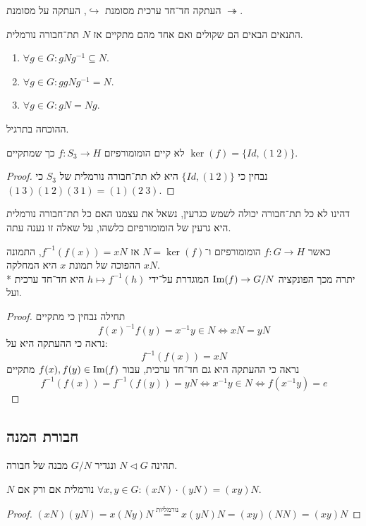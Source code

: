 \begin{notation}
	העתקה חד־חד ערכית מסומנת $\hookrightarrow$,
	העתקה על מסומנת $\twoheadrightarrow$.
\end{notation}
\begin{proposition}
	התנאים הבאים הם שקולים ואם אחד מהם מתקיים אז $N$ תת־חבורה נורמלית.
	\begin{enumerate}
		\item $\forall g \in G : g N g^{-1} \subseteq N$.
		\item $\forall g \in G : g g N g^{-1} = N$.
		\item $\forall g \in G : g N = N g$.
	\end{enumerate}
	ההוכחה בתרגיל.
\end{proposition}
\begin{conclusion}
	לא קיים הומומורפיזם $f : S_3 \to H$ כך שמתקיים $\ker(f) = \{ Id, (1\ 2) \}$.
\end{conclusion}
\begin{proof}
	נבחין כי $\{ Id, (1\ 2)\}$ היא לא תת־חבורה נורמלית של $S_3$ כי $(1\ 3)(1\ 2)(3\ 1) = (1)(2\ 3)$.
\end{proof}
דהינו לא כל תת־חבורה יכולה לשמש כגרעין, נשאל את עצמנו האם כל תת־חבורה נורמלית היא גרעין של הומומורפיזם כלשהו, על שאלה זו נענה עתה.

\begin{proposition}
	כאשר $f : G \to H$ הומומורפיזם ו־$N = \ker(f)$ אז $f^{-1}(f(x)) = x N$, התמונה ההפוכה של תמונת $x$ היא המחלקה $x N$. \\*
	יתרה מכך הפונקציה $\operatorname{Im}(f) \to G/N$ המוגדרת על־ידי $h \mapsto f^{-1}(h)$ היא חד־חד ערכית ועל.
\end{proposition}
\begin{proof}
	תחילה נבחין כי מתקיים
	\[
		{f(x)}^{-1} f(y) = x^{-1} y \in N \iff xN = yN
	\]
	נראה כי ההעתקה היא על:
	\[
		f^{-1}(f(x)) = xN
	\]
	נראה כי ההעתקה היא גם חד־חד ערכית,
	עבור $f(x), f(y) \in \operatorname{Im}(f)$ מתקיים
	\[
		f^{-1}(f(x)) = f^{-1}(f(y)) = yN
		\iff
		x^{-1} y \in N
		\iff
		f(x^{-1} y) = e
	\]
\end{proof}

\subsection{חבורת המנה}
תהינה $N \triangleleft G$ ונגדיר $G/N$ מבנה של חבורה.

\begin{proposition}
	$N$ נורמלית אם ורק אם $\forall x, y \in G : (xN) \cdot (yN) = (xy)N$.
\end{proposition}
\begin{proof}
	$(x N)(y N) = x (Ny) N \overset{\text{נורמליות}}{=} x (yN) N = (xy)(NN) = (xy)N$
\end{proof}

